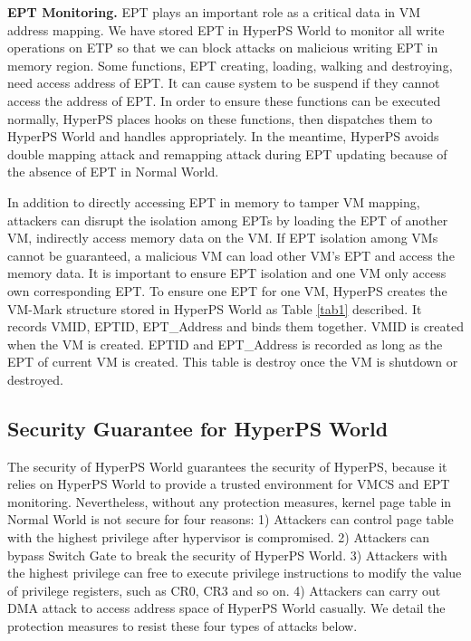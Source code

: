 \documentclass[conference]{IEEEtran}
\begin{document}
\textbf{EPT Monitoring.}
EPT plays an important role as a critical data in VM address mapping. We have stored EPT in HyperPS World to monitor all write operations on ETP so that we can block attacks on malicious writing EPT in memory region.
Some functions, EPT creating, loading, walking and destroying, need access address of EPT. It can cause system to be suspend if they cannot access the address of EPT. In order to ensure these functions can be executed normally, HyperPS places hooks on these functions, then dispatches them to HyperPS World and handles appropriately.
In the meantime, HyperPS avoids double mapping attack and remapping attack during EPT updating because of the absence of EPT in Normal World.

In addition to directly accessing EPT in memory to tamper VM mapping, attackers can disrupt the isolation among EPTs by loading the EPT of another VM, indirectly access memory data on the VM.
If EPT isolation among VMs cannot be guaranteed, a malicious VM can load other VM's EPT and access the memory data. It is important to ensure EPT isolation and one VM only access own corresponding EPT.
To ensure one EPT for one VM, HyperPS creates the VM-Mark structure stored in HyperPS World as Table \ref{tab1} described. It records VMID, EPTID, EPT\_Address and binds them together. VMID is created when the VM is created. 
 EPTID and EPT\_Address is recorded as long as the EPT of current VM is created. This table is destroy once the  VM is shutdown or destroyed.


\subsection{Security Guarantee for HyperPS World}\label {SG}
The security of HyperPS World guarantees the security of HyperPS, because it relies on HyperPS World to provide a trusted environment for VMCS and EPT monitoring.
Nevertheless, without any protection measures, kernel page table in Normal World is not secure for four reasons: 1) Attackers can control page table with the highest privilege after hypervisor is compromised. 2) Attackers can bypass Switch Gate to break the security of HyperPS World. 3) Attackers with the highest privilege can free to execute privilege instructions to modify the value of privilege registers, such as CR0, CR3 and so on. 4) Attackers can carry out DMA attack to access address space of HyperPS World casually.
We detail the protection measures to resist these four types of attacks below.
\end{document}
